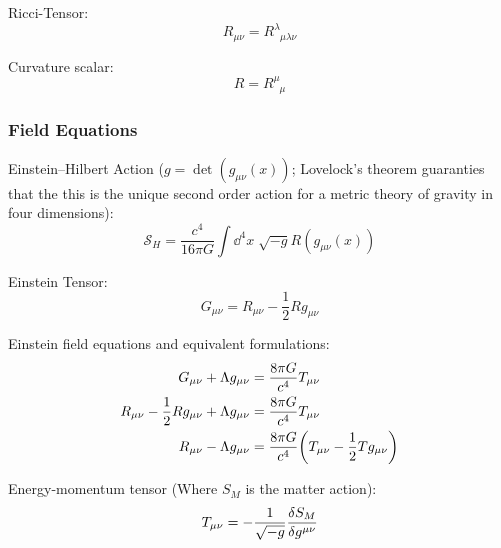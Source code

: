 			\noindent
			Ricci-Tensor:
			\begin{equation}
				R_{\mu\nu} = R^\lambda_{\phantom{\lambda}\mu\lambda\nu}
			\end{equation}

			\noindent
			Curvature scalar:
			\begin{equation}
				R = R^\mu_{\phantom{\mu}\mu}
			\end{equation}

		\subsubsection{Field Equations}
			\noindent
			Einstein--Hilbert Action ($g=\det(g_{\mu\nu}(x))$; Lovelock's theorem guaranties that the this is the unique second order action for a metric theory of gravity in four dimensions):
			\begin{equation}
				\mathcal{S}_H = \frac{c^4}{16\pi G} \int\dd^4 x\; \sqrt{-g} R(g_{\mu\nu}(x))
			\end{equation}

			\noindent
			Einstein Tensor:
			\begin{equation}
				G_{\mu\nu} = R_{\mu\nu} - \frac{1}{2} R g_{\mu\nu}
			\end{equation}

			\noindent
			Einstein field equations and equivalent formulations:
			\begin{align}
				G_{\mu\nu} + \Lambda g_{\mu\nu} &= \frac{8\pi G}{c^4} T_{\mu\nu} \\
				R_{\mu\nu} - \frac{1}{2} R g_{\mu\nu} + \Lambda g_{\mu\nu} &= \frac{8\pi G}{c^4} T_{\mu\nu} \\
				R_{\mu\nu} - \Lambda g_{\mu\nu}&= \frac{8\pi G}{c^4} \qty( T_{\mu\nu} - \frac{1}{2} T g_{\mu\nu} )
			\end{align}

			\noindent
			Energy-momentum tensor (Where $S_M$ is the matter action):
			\begin{equation}
				T_{\mu\nu} = -\frac{1}{\sqrt{-g}} \fdv{S_M}{g^{\mu\nu}}
			\end{equation}


